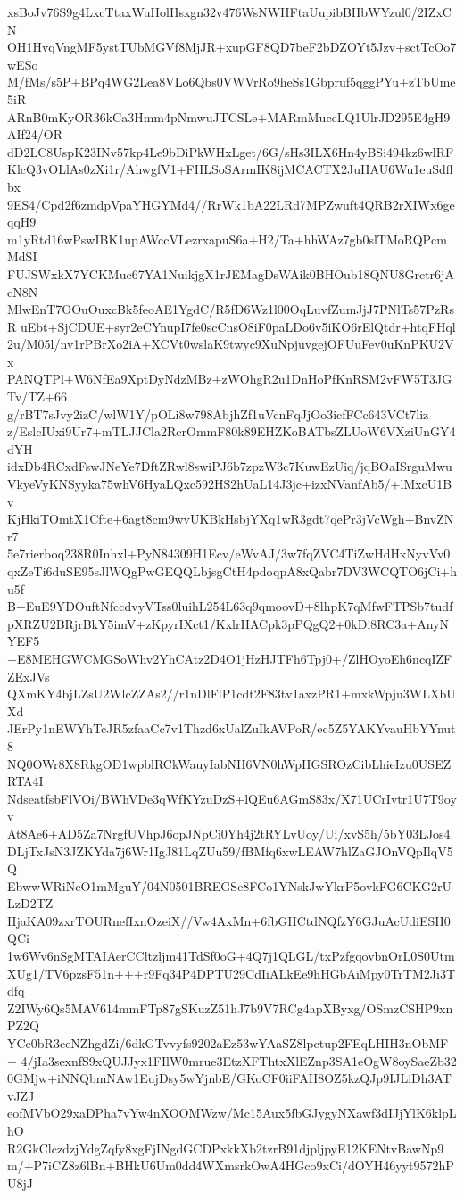 xsBoJv76S9g4LxcTtaxWuHolHsxgn32v476WsNWHFtaUupibBHbWYzul0/2IZxCN
OH1HvqVngMF5ystTUbMGVf8MjJR+xupGF8QD7beF2bDZOYt5Jzv+sctTcOo7wESo
M/fMs/s5P+BPq4WG2Lea8VLo6Qbs0VWVrRo9heSs1Gbpruf5qggPYu+zTbUme5iR
ARnB0mKyOR36kCa3Hmm4pNmwuJTCSLe+MARmMuccLQ1UlrJD295E4gH9AIf24/OR
dD2LC8UspK23INv57kp4Le9bDiPkWHxLget/6G/sHs3ILX6Hn4yBSi494kz6wlRF
KlcQ3vOLlAs0zXi1r/AhwgfV1+FHLSoSArmIK8ijMCACTX2JuHAU6Wu1euSdflbx
9ES4/Cpd2f6zmdpVpaYHGYMd4//RrWk1bA22LRd7MPZwuft4QRB2rXIWx6geqqH9
m1yRtd16wPswIBK1upAWccVLezrxapuS6a+H2/Ta+hhWAz7gb0slTMoRQPcmMdSI
FUJSWxkX7YCKMuc67YA1NuikjgX1rJEMagDsWAik0BHOub18QNU8Grctr6jAcN8N
MlwEnT7OOuOuxcBk5feoAE1YgdC/R5fD6Wz1l00OqLuvfZumJjJ7PNlTs57PzRsR
uEbt+SjCDUE+syr2eCYnupI7fe0scCnsO8iF0paLDo6v5iKO6rElQtdr+htqFHql
2u/M05l/nv1rPBrXo2iA+XCVt0wslaK9twyc9XuNpjuvgejOFUuFev0uKnPKU2Vx
PANQTPl+W6NfEa9XptDyNdzMBz+zWOhgR2u1DnHoPfKnRSM2vFW5T3JGTv/TZ+66
g/rBT7sJvy2izC/wlW1Y/pOLi8w798AbjhZf1uVcnFqJjOo3icfFCc643VCt7liz
z/EslcIUxi9Ur7+mTLJJCla2RcrOmmF80k89EHZKoBATbsZLUoW6VXziUnGY4dYH
idxDb4RCxdFswJNeYe7DftZRwl8swiPJ6b7zpzW3c7KuwEzUiq/jqBOaISrguMwu
VkyeVyKNSyyka75whV6HyaLQxc592HS2hUaL14J3jc+izxNVanfAb5/+lMxcU1Bv
KjHkiTOmtX1Cfte+6agt8cm9wvUKBkHsbjYXq1wR3gdt7qePr3jVcWgh+BnvZNr7
5e7rierboq238R0Inhxl+PyN84309H1Ecv/eWvAJ/3w7fqZVC4TiZwHdHxNyvVv0
qxZeTi6duSE95sJlWQgPwGEQQLbjsgCtH4pdoqpA8xQabr7DV3WCQTO6jCi+hu5f
B+EuE9YDOuftNfccdvyVTss0luihL254L63q9qmoovD+8lhpK7qMfwFTPSb7tudf
pXRZU2BRjrBkY5imV+zKpyrIXct1/KxlrHACpk3pPQgQ2+0kDi8RC3a+AnyNYEF5
+E8MEHGWCMGSoWhv2YhCAtz2D4O1jHzHJTFh6Tpj0+/ZlHOyoEh6ncqIZFZExJVs
QXmKY4bjLZsU2WlcZZAs2//r1nDlFlP1cdt2F83tv1axzPR1+mxkWpju3WLXbUXd
JErPy1nEWYhTcJR5zfaaCc7v1Thzd6xUalZuIkAVPoR/ec5Z5YAKYvauHbYYnut8
NQ0OWr8X8RkgOD1wpblRCkWauyIabNH6VN0hWpHGSROzCibLhieIzu0USEZRTA4I
NdseatfsbFlVOi/BWhVDe3qWfKYzuDzS+lQEu6AGmS83x/X71UCrIvtr1U7T9oyv
At8Ae6+AD5Za7NrgfUVhpJ6opJNpCi0Yh4j2tRYLvUoy/Ui/xvS5h/5bY03LJos4
DLjTxJsN3JZKYda7j6Wr1IgJ81LqZUu59/fBMfq6xwLEAW7hlZaGJOnVQpIlqV5Q
EbwwWRiNcO1mMguY/04N0501BREGSe8FCo1YNskJwYkrP5ovkFG6CKG2rULzD2TZ
HjaKA09zxrTOURnefIxnOzeiX//Vw4AxMn+6fbGHCtdNQfzY6GJuAcUdiESH0QCi
1w6Wv6nSgMTAIAerCCltzljm41TdSf0oG+4Q7j1QLGL/txPzfgqovbnOrL0S0Utm
XUg1/TV6pzsF51n+++r9Fq34P4DPTU29CdIiALkEe9hHGbAiMpy0TrTM2Ji3Tdfq
Z2IWy6Qs5MAV614mmFTp87gSKuzZ51hJ7b9V7RCg4apXByxg/OSmzCSHP9xnPZ2Q
YCe0bR3eeNZhgdZi/6dkGTvvyfs9202aEz53wYAaSZ8lpctup2FEqLHIH3nObMF+
4/jIa3sexnfS9xQUJJyx1FIlW0mrue3EtzXFThtxXlEZnp3SA1eOgW8oySaeZb32
0GMjw+iNNQbmNAw1EujDsy5wYjnbE/GKoCF0iiFAH8OZ5kzQJp9IJLiDh3ATvJZJ
eofMVbO29xaDPha7vYw4nXOOMWzw/Mc15Aux5fbGJygyNXawf3dIJjYlK6klpLhO
R2GkClczdzjYdgZqfy8xgFjINgdGCDPxkkXb2tzrB91djpljpyE12KENtvBawNp9
m/+P7iCZ8z6lBn+BHkU6Um0dd4WXmsrkOwA4HGco9xCi/dOYH46yyt9572hPU8jJ
